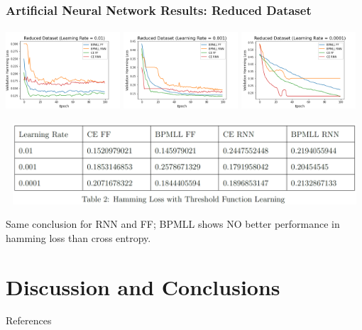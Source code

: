 \documentclass{beamer}
\begin{document}
\begin{frame}[t]
\frametitle{Artificial Neural Network Results: Reduced Dataset}
\begin{center}

\includegraphics[width=0.32\textwidth,height=3cm]{Images/Reduced_Dataset_Learning_Rate_01.png}
\includegraphics[width=0.32\textwidth,height=3cm]{Images/Reduced_Dataset_Learning_Rate_001.png}
\includegraphics[width=0.32\textwidth,height=3cm]{Images/Reduced_Dataset_Learning_Rate_0001.png}        
\end{center}

\begin{center}

\includegraphics[width=1\textwidth,height=3cm]{Images/Threshold learning for reduced dataset.png}
\end{center}

Same conclusion for RNN and FF; BPMLL shows NO
better performance in hamming loss than cross entropy.
\end{frame}

\section{Discussion and Conclusions}

\begin{frame}[t]{References}
    \nocite{mlknn}
    \nocite{bpmll}
    
\end{frame}
\end{document}

